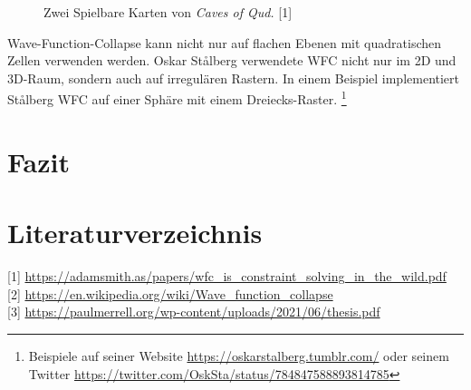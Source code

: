 \documentclass[12pt, a4paper,twoside,openright]{report}
\begin{document}
\begin{figure}[H]
    \centering
    \caption{Zwei Spielbare Karten von \textit{Caves of Qud.} {[1]}}%
\end{figure}

Wave-Function-Collapse kann nicht nur auf flachen Ebenen mit quadratischen Zellen verwenden werden.
Oskar Stålberg verwendete WFC nicht nur im 2D und 3D-Raum, sondern auch auf irregulären Rastern.
In einem Beispiel implementiert Stålberg WFC auf einer Sphäre mit einem Dreiecks-Raster.
\footnote[6]{Beispiele auf seiner Website
\url{https://oskarstalberg.tumblr.com/}
oder seinem Twitter
\url{https://twitter.com/OskSta/status/784847588893814785}}

{\let\clearpage\relax\chapter{Fazit}}



{\let\clearpage\relax\chapter{Literaturverzeichnis}}
{[1]} \url{https://adamsmith.as/papers/wfc_is_constraint_solving_in_the_wild.pdf}\\
{[2]} \url{https://en.wikipedia.org/wiki/Wave_function_collapse}\\
{[3]} \url{https://paulmerrell.org/wp-content/uploads/2021/06/thesis.pdf}\\
\end{document}
